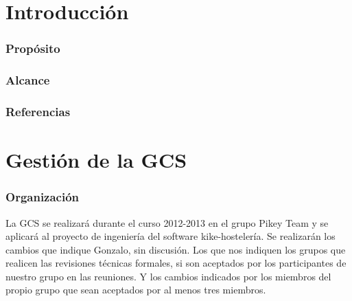 \documentclass[spanish,a4paper,11pt, twoside]{report}	%
\begin{document}
\newpage
\mbox{}
\thispagestyle{empty}						%
\newpage


\tableofcontents 							%

\newpage
\mbox{}
\thispagestyle{empty}						%
\newpage


\part{Introducción}
	\section{Propósito}
	\section{Alcance}
	\section{Referencias}

\newpage
\mbox{}
\thispagestyle{empty}						%
\newpage

\setcounter{section}{0}

\part{Gestión de la GCS }
	\section{Organización}
	La GCS se realizará durante el curso 2012-2013 en  el grupo Pikey Team y se aplicará al proyecto de ingeniería del software kike-hostelería. Se realizarán  los cambios que indique Gonzalo, sin discusión. Los que nos indiquen
	los grupos que realicen las revisiones técnicas formales, si son aceptados por los participantes de nuestro grupo en las reuniones. Y los cambios indicados por los miembros del propio grupo que sean aceptados por al menos tres miembros.
\end{document}
